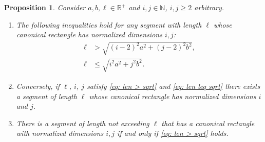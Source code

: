 \documentclass[12pt, a4paper]{article}
\newcommand{\len}{\ell} %
\newtheorem{proposition}{Proposition}%
\begin{document}
\begin{proposition}
\label{prop: len ineq i j}
Consider $a, b, \len \in \mathbb R^+$ and $i, j \in \mathbb N$, $i, j \geq 2$ arbitrary.
\begin{enumerate}
\item
\label{prop: len ineq i j: ineqs}
The following inequalities hold for any segment with length $\len$ whose canonical rectangle has normalized dimensions $i, j$:
\begin{align}
\label{eq: len > sqrt}
\len &> \sqrt{(i-2)^2 a^2 + (j-2)^2 b^2}, \\
\label{eq: len leq sqrt}
\len &\leq \sqrt{i^2 a^2 + j^2 b^2}.
\end{align}
\item
\label{prop: len ineq i j: exist}
Conversely, if $\len$, $i$, $j$ satisfy \eqref{eq: len > sqrt} and \eqref{eq: len leq sqrt} there exists a segment of length $\len$ whose canonical rectangle has normalized dimensions $i$ and $j$.
\item
\label{prop: len ineq i j: ineq, exist}
There is a segment of length not exceeding $\len$ that has a canonical rectangle with normalized dimensions $i, j$ if and only if \eqref{eq: len > sqrt} holds.
\end{enumerate}
\end{proposition}
\end{document}
